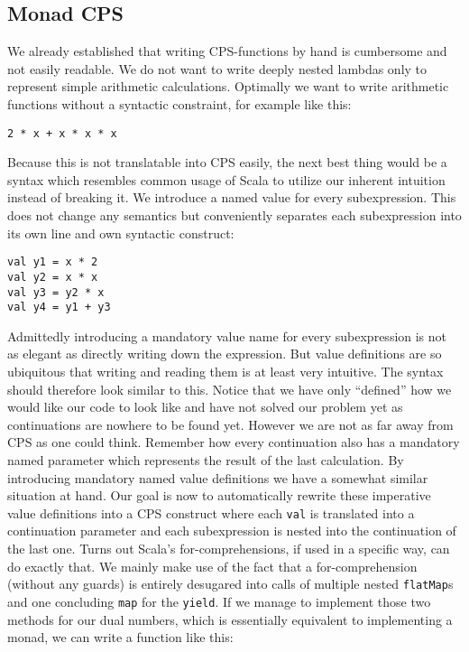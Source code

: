 \subsection{Monad CPS} \label{sec:monadCPS}

We already established that writing CPS-functions by hand is cumbersome and not easily readable. We do not want to write deeply nested lambdas only to represent simple arithmetic calculations. Optimally we want to write arithmetic functions without a syntactic constraint, for example like this:
\begin{lstlisting}
2 * x + x * x * x
\end{lstlisting}
Because this is not translatable into CPS easily, the next best thing would be a syntax which resembles common usage of Scala to utilize our inherent intuition instead of breaking it. We introduce a named value for every subexpression. This does not change any semantics but conveniently separates each subexpression into its own line and own syntactic construct:
\begin{lstlisting}
val y1 = x * 2
val y2 = x * x
val y3 = y2 * x
val y4 = y1 + y3
\end{lstlisting}
Admittedly introducing a mandatory value name for every subexpression is not as elegant as directly writing down the expression. But value definitions are so ubiquitous that writing and reading them is at least very intuitive. The syntax should therefore look similar to this. Notice that we have only ``defined'' how we would like our code to look like and have not solved our problem yet as continuations are nowhere to be found yet. However we are not as far away from CPS as one could think. Remember how every continuation also has a mandatory named parameter which represents the result of the last calculation. By introducing mandatory named value definitions we have a somewhat similar situation at hand. Our goal is now to automatically rewrite these imperative value definitions into a CPS construct where each \lstinline{val} is translated into a continuation parameter and each subexpression is nested into the continuation of the last one.
Turns out Scala's for-comprehensions, if used in a specific way, can do exactly that. We mainly make use of the fact that a for-comprehension (without any guards) is entirely desugared into calls of multiple nested \lstinline{flatMap}s and one concluding \lstinline{map} for the \lstinline{yield}. If we manage to implement those two methods for our dual numbers, which is essentially equivalent to implementing a monad, we can write a function like this:
